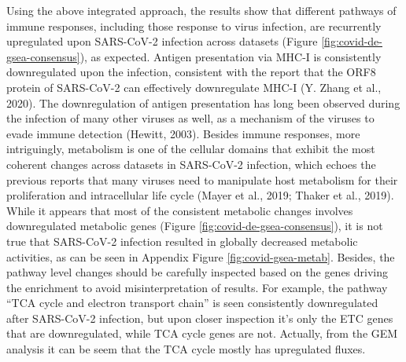 \documentclass[12pt,twoside,openany,\mydriver]{thesis}  %
\begin{document}
Using the above integrated approach, the results show that different pathways of immune responses, including those response to virus infection, are recurrently upregulated upon SARS-CoV-2 infection across datasets (Figure \ref{fig:covid-de-gsea-consensus}), as expected. Antigen presentation via MHC-I is consistently downregulated upon the infection, consistent with the report that the ORF8 protein of SARS-CoV-2 can effectively downregulate MHC-I (Y. Zhang et al., 2020). The downregulation of antigen presentation has long been observed during the infection of many other viruses as well, as a mechanism of the viruses to evade immune detection (Hewitt, 2003). Besides immune responses, more intriguingly, metabolism is one of the cellular domains that exhibit the most coherent changes across datasets in SARS-CoV-2 infection, which echoes the previous reports that many viruses need to manipulate host metabolism for their proliferation and intracellular life cycle (Mayer et al., 2019; Thaker et al., 2019). While it appears that most of the consistent metabolic changes involves downregulated metabolic genes (Figure \ref{fig:covid-de-gsea-consensus}), it is not true that SARS-CoV-2 infection resulted in globally decreased metabolic activities, as can be seen in Appendix Figure \ref{fig:covid-gsea-metab}. Besides, the pathway level changes should be carefully inspected based on the genes driving the enrichment to avoid misinterpretation of results. For example, the pathway ``TCA cycle and electron transport chain'' is seen consistently downregulated after SARS-CoV-2 infection, but upon closer inspection it's only the ETC genes that are downregulated, while TCA cycle genes are not. Actually, from the GEM analysis it can be seem that the TCA cycle mostly has upregulated fluxes.
\end{document}
